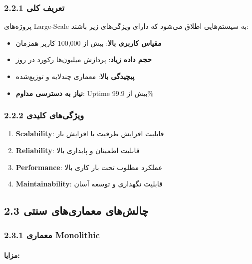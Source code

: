 \documentclass[
]{article}
\providecommand{\tightlist}{%
  \setlength{\itemsep}{0pt}\setlength{\parskip}{0pt}}
\begin{document}
\subsubsection{2.2.1 تعریف
کلی}\label{ux62aux639ux631ux6ccux641-ux6a9ux644ux6cc}

پروژه‌های Large-Scale به سیستم‌هایی اطلاق می‌شود که دارای ویژگی‌های زیر
باشند:

\begin{itemize}
\tightlist
\item
  \textbf{مقیاس کاربری بالا}: بیش از 100,000 کاربر همزمان
\item
  \textbf{حجم داده زیاد}: پردازش میلیون‌ها رکورد در روز
\item
  \textbf{پیچیدگی بالا}: معماری چندلایه و توزیع‌شده
\item
  \textbf{نیاز به دسترسی مداوم}: Uptime بیش از 99.9\%
\end{itemize}

\subsubsection{2.2.2 ویژگی‌های
کلیدی}\label{ux648ux6ccux698ux6afux6ccux647ux627ux6cc-ux6a9ux644ux6ccux62fux6cc}

\begin{enumerate}
\def\labelenumi{\arabic{enumi}.}
\tightlist
\item
  \textbf{Scalability}: قابلیت افزایش ظرفیت با افزایش بار
\item
  \textbf{Reliability}: قابلیت اطمینان و پایداری بالا
\item
  \textbf{Performance}: عملکرد مطلوب تحت بار کاری بالا
\item
  \textbf{Maintainability}: قابلیت نگهداری و توسعه آسان
\end{enumerate}

\subsection{2.3 چالش‌های معماری‌های
سنتی}\label{ux686ux627ux644ux634ux647ux627ux6cc-ux645ux639ux645ux627ux631ux6ccux647ux627ux6cc-ux633ux646ux62aux6cc}

\subsubsection{2.3.1 معماری
Monolithic}\label{ux645ux639ux645ux627ux631ux6cc-monolithic}

\paragraph{مزایا:}\label{ux645ux632ux627ux6ccux627}
\end{document}
